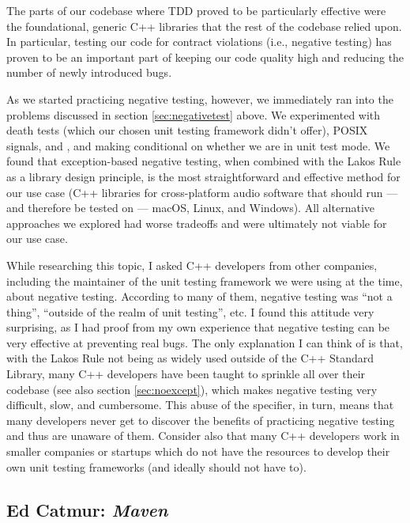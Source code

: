 The parts of our codebase where TDD proved to be particularly effective were the foundational, generic C++ libraries that the rest of the codebase relied upon. In particular, testing our code for contract violations (i.e., negative testing) has proven to be an important part of keeping our code quality high and reducing the number of newly introduced bugs. 

As we started practicing negative testing, however, we immediately ran into the problems discussed in section \ref{sec:negativetest} above. We experimented with death tests (which our chosen unit testing framework didn't offer), POSIX signals,  and , and making  conditional on whether we are in unit test mode. We found that exception-based negative testing, when combined with the Lakos Rule as a library design principle, is the most straightforward and effective method for our use case (C++ libraries for cross-platform audio software that should run --- and therefore be tested on --- macOS, Linux, and Windows). All alternative approaches we explored had worse tradeoffs and were ultimately not viable for our use case.

While researching this topic, I asked C++ developers from other companies, including the maintainer of the unit testing framework we were using at the time, about negative testing. According to many of them, negative testing was ``not a thing'', ``outside of the realm of unit testing'', etc. I found this attitude very surprising, as I had proof from my own experience that negative testing can be very effective at preventing real bugs. The only explanation I can think of is that, with the Lakos Rule not being as widely used outside of the C++ Standard Library, many C++ developers have been taught to sprinkle  all over their codebase (see also section \ref{sec:noexcept}), which makes negative testing very difficult, slow, and cumbersome. This abuse of the  specifier, in turn, means that many developers never get to discover the benefits of practicing negative testing and thus are unaware of them. Consider also that many C++ developers work in smaller companies or startups which do not have the resources to develop their own unit testing frameworks (and ideally should not have to).

\subsection{Ed Catmur: \emph{Maven}}

